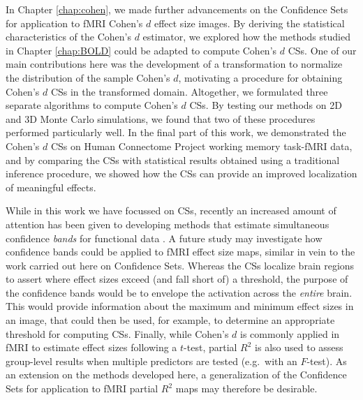 In Chapter \ref{chap:cohen}, we made further advancements on the Confidence Sets for application to fMRI Cohen's $d$ effect size images. By deriving the statistical characteristics of the Cohen's $d$ estimator, we explored how the methods studied in Chapter \ref{chap:BOLD} could be adapted to compute Cohen's $d$ CSs. One of our main contributions here was the development of a transformation to normalize the distribution of the sample Cohen's $d$, motivating a procedure for obtaining Cohen's $d$ CSs in the transformed domain. Altogether, we formulated three separate algorithms to compute Cohen's $d$ CSs. By testing our methods on 2D and 3D Monte Carlo simulations, we found that two of these procedures performed particularly well. In the final part of this work, we demonstrated the Cohen's $d$ CSs on Human Connectome Project working memory task-fMRI data, and by comparing the CSs with statistical results obtained using a traditional inference procedure, we showed how the CSs can provide an improved localization of meaningful effects.

While in this work we have focussed on CSs, recently an increased amount of attention has been given to developing methods that estimate simultaneous confidence \textit{bands} for functional data \citep{Degras2017-sw,Telschow2019-lg}. A future study may investigate how confidence bands could be applied to fMRI effect size maps, similar in vein to the work carried out here on Confidence Sets. Whereas the CSs localize brain regions to assert where effect sizes exceed (and fall short of) a threshold, the purpose of the confidence bands would be to envelope the activation across the \textit{entire} brain. This would provide information about the maximum and minimum effect sizes in an image, that could then be used, for example, to determine an appropriate threshold for computing CSs. Finally, while Cohen's $d$ is commonly applied in fMRI to estimate effect sizes following a $t$-test, partial $R^{2}$ is also used to assess group-level results when multiple predictors are tested (e.g.\ with an $F$-test). As an extension on the methods developed here, a generalization of the Confidence Sets for application to fMRI partial $R^{2}$ maps may therefore be desirable.
